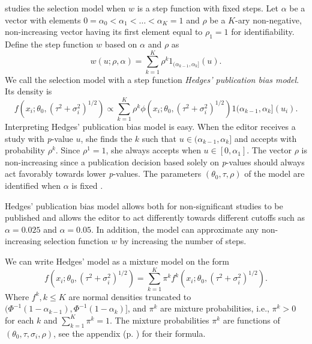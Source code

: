 \documentclass[article]{ajs}
\numberwithin{equation}{section}
\numberwithin{figure}{section}
\theoremstyle{plain}
\theoremstyle{definition}
\theoremstyle{definition}
\theoremstyle{plain}
\renewcommand{\sqrt}[1]{{(#1)^{1/2}}}
\begin{document}
\citet{hedges1992modeling} studies the selection model when $w$ is a step function with fixed steps. Let $\alpha$ be a vector with elements $0=\alpha_{0}<\alpha_{1}<\ldots<\alpha_{K}=1$ and $\rho$ be a $K$-ary non-negative, non-increasing vector having its first element equal to $\rho_{1}=1$ for identifiability. Define the step function $w$ based on $\alpha$ and $\rho$ as
\begin{equation}
w(u;\rho,\alpha)=\sum_{k=1}^{K}\rho^{k}1_{(\alpha_{k-1},\alpha_{k}]}(u).\label{eq:step function}
\end{equation}
We call the selection model with a step function \emph{Hedges' publication bias model}. Its density is
\begin{equation}
f(x_{i};\theta_{0},\sqrt{\tau^{2}+\sigma_{i}^{2}})\propto\sum_{k=1}^{K}\rho^{k}\phi(x_{i};\theta_{0},\sqrt{\tau^{2}+\sigma_{i}^{2}})1{(\alpha_{k-1},\alpha_{k}]}(u_{i}).\label{eq:hedges model}
\end{equation}
Interpreting Hedges' publication bias model is easy. When the editor receives a study with \textit{p}-value $u$, she finds the $k$ such that $u\in(\alpha_{k-1},\alpha_{k}]$ and accepts with probability $\rho^{k}$. Since $\rho^{1}=1$, she always accepts when $u\in[0,\alpha_{1}]$. The vector $\rho$ is non-increasing since a publication decision based solely on \textit{p}-values should always act favorably towards lower \textit{p}-values. The parameters $(\theta_{0},\tau,\rho)$ of the model are identified when $\alpha$ is fixed \citep[Web Appendix A]{moss2019modelling}.

Hedges' publication bias model allows both for non-significant studies to be published and allows the editor to act differently towards different cutoffs such as $\alpha=0.025$ and $\alpha=0.05$. In addition, the model can approximate any non-increasing selection function $w$ by increasing the number of steps.

We can write Hedges' model as a mixture model on the form
\begin{equation}
f(x_{i};\theta_{0},\sqrt{\tau^{2}+\sigma_{i}^{2}})=\sum_{k=1}^{K}\pi^{k}f^{k}(x_{i};\theta_{0},\sqrt{\tau^{2}+\sigma_{i}^{2}}).\label{eq:mixture model formulation}
\end{equation}
Where $f^{k},k\leq K$ are normal densities
truncated to $(\Phi^{-1}(1-\alpha_{k-1}),\Phi^{-1}(1-\alpha_k)]$, and $\pi^{k}$ are mixture probabilities, i.e., $\pi^{k}>0$ for each $k$ and $\sum_{k=1}^{K}\pi^{k}=1$. The mixture probabilities $\pi^{k}$ are functions of $(\theta_{0},\tau,\sigma_{i},\rho)$, see the appendix (p. \pageref{eq:pi_i formula}) for their formula.
\end{document}
